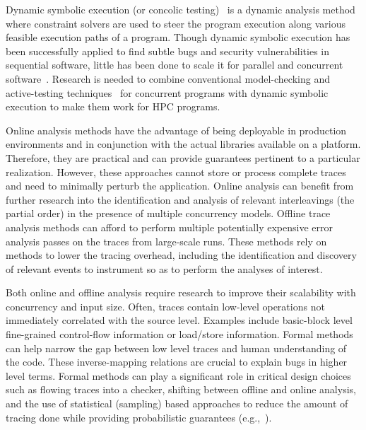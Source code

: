 Dynamic symbolic execution (or concolic testing)~\cite{CACM'13,PLDI'05,FSE'05,klee:osdi:2008} is a dynamic analysis method where constraint solvers are used to steer the program execution along various feasible execution paths of a program. Though dynamic symbolic execution has been successfully applied to find subtle bugs and security vulnerabilities in sequential software,  little has been done to scale it for parallel and concurrent software~\cite{SAcav06,SAhvc06}.  Research is needed  to combine conventional model-checking and active-testing techniques~\cite{Spldi08,JNPScav09} for concurrent programs with dynamic symbolic execution to make them work for HPC programs.   


 
Online  analysis methods have the advantage of being 
 deployable in production environments and 
 in conjunction with the actual libraries 
 available on a platform. Therefore, they are
 practical and can provide 
 guarantees pertinent to a particular realization. However, these approaches cannot store or process complete traces and need to minimally perturb the application. Online analysis can benefit from further research into the identification and analysis of relevant interleavings (the partial order) in the presence of multiple concurrency models.
% 
%
Offline  trace analysis methods can afford to perform multiple potentially expensive error analysis passes on the traces from large-scale runs. These methods rely on methods to lower the tracing overhead, including the identification and discovery of relevant events to instrument so as to perform the analyses of interest. 

Both online and offline analysis require research to improve their scalability with concurrency and input size. Often, traces contain low-level operations not immediately correlated with the source level. Examples include basic-block level fine-grained control-flow information or load/store information. 
%
Formal methods can help narrow the gap
between low level traces and human understanding
of the code. These inverse-mapping relations are 
crucial to explain bugs in higher
level terms.
Formal methods can play
a significant role in critical 
design choices such as 
flowing traces into a checker,
shifting between offline and online
analysis, and the use of statistical (sampling)
based approaches to reduce the amount of
tracing done while providing
probabilistic guarantees (e.g.,~\cite{DBLP:conf/asplos/BurckhardtKMN10}).

